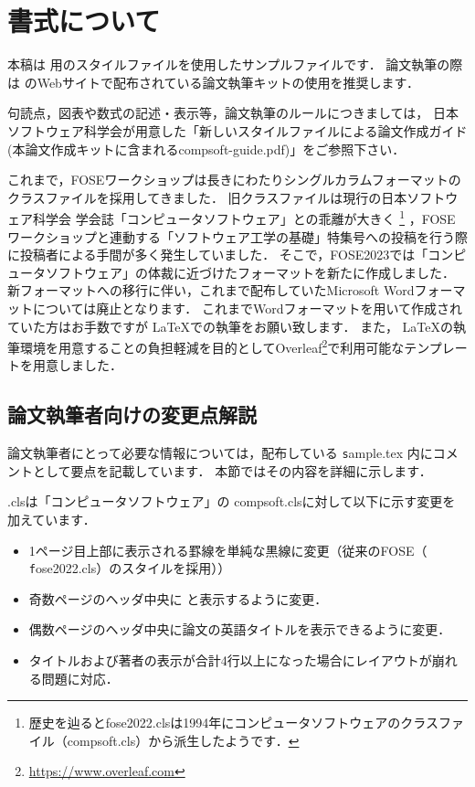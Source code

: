 \documentclass[T,J]{fose} %
\newcommand{\foseclassfile}{\MakeLowercase{\foseabbrev}.cls}
\begin{document}
\section{書式について} \label{sec:PaperStyle}
本稿は \foseabbrev 用のスタイルファイルを使用したサンプルファイルです．
論文執筆の際は \foseabbrev のWebサイトで配布されている論文執筆キットの使用を推奨します．

句読点，図表や数式の記述・表示等，論文執筆のルールにつきましては，
日本ソフトウェア科学会が用意した「新しいスタイルファイルによる論文作成ガイド(本論文作成キットに含まれるcompsoft-guide.pdf)」をご参照下さい．

これまで，FOSEワークショップは長きにわたりシングルカラムフォーマットのクラスファイルを採用してきました．
旧クラスファイルは現行の日本ソフトウェア科学会 学会誌「コンピュータソフトウェア」との乖離が大きく
\footnote{歴史を辿るとfose2022.clsは1994年にコンピュータソフトウェアのクラスファイル（compsoft.cls）から派生したようです．}
，FOSEワークショップと連動する「ソフトウェア工学の基礎」特集号への投稿を行う際に投稿者による手間が多く発生していました．
そこで，FOSE2023では「コンピュータソフトウェア」の体裁に近づけたフォーマットを新たに作成しました．
新フォーマットへの移行に伴い，これまで配布していたMicrosoft Wordフォーマットについては廃止となります．
これまでWordフォーマットを用いて作成されていた方はお手数ですが \LaTeX での執筆をお願い致します．
また， \LaTeX の執筆環境を用意することの負担軽減を目的としてOverleaf\footnote{\url{https://www.overleaf.com}}で利用可能なテンプレートを用意しました．

\subsection{論文執筆者向けの変更点解説}\label{subsec:forauthors}
論文執筆者にとって必要な情報については，配布している {\texttt sample.tex} 内にコメントとして要点を記載しています．
本節ではその内容を詳細に示します．

\foseclassfile は「コンピュータソフトウェア」の compsoft.clsに対して以下に示す変更を加えています．
\begin{itemize}
	\item 1ページ目上部に表示される罫線を単純な黒線に変更（従来のFOSE（ {\texttt fose2022.cls}）のスタイルを採用））
	\item 奇数ページのヘッダ中央に {\textbf \foseabbrev } と表示するように変更．
	\item 偶数ページのヘッダ中央に論文の英語タイトルを表示できるように変更．
	\item タイトルおよび著者の表示が合計4行以上になった場合にレイアウトが崩れる問題に対応．
\end{itemize}
\end{document}
